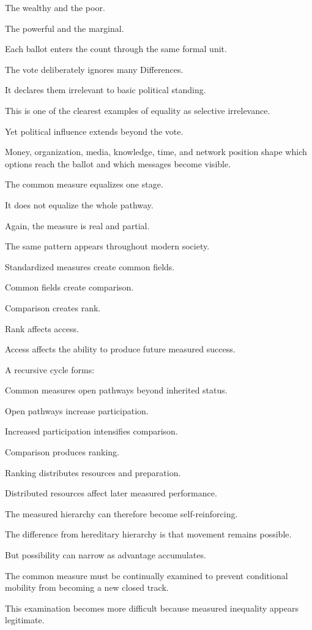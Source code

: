 The wealthy and the poor.

The powerful and the marginal.

Each ballot enters the count through the same formal unit.

The vote deliberately ignores many Differences.

It declares them irrelevant to basic political standing.

This is one of the clearest examples of equality as selective irrelevance.

Yet political influence extends beyond the vote.

Money, organization, media, knowledge, time, and network position shape which options reach the ballot and which messages become visible.

The common measure equalizes one stage.

It does not equalize the whole pathway.

Again, the measure is real and partial.

The same pattern appears throughout modern society.

Standardized measures create common fields.

Common fields create comparison.

Comparison creates rank.

Rank affects access.

Access affects the ability to produce future measured success.

A recursive cycle forms:

Common measures open pathways beyond inherited status.

Open pathways increase participation.

Increased participation intensifies comparison.

Comparison produces ranking.

Ranking distributes resources and preparation.

Distributed resources affect later measured performance.

The measured hierarchy can therefore become self-reinforcing.

The difference from hereditary hierarchy is that movement remains possible.

But possibility can narrow as advantage accumulates.

The common measure must be continually examined to prevent conditional mobility from becoming a new closed track.

This examination becomes more difficult because measured inequality appears legitimate.

